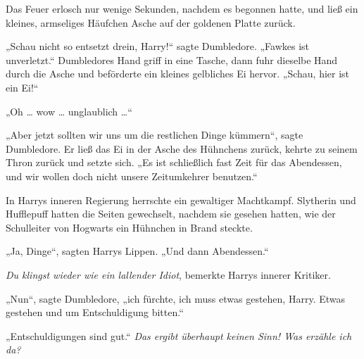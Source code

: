 Das Feuer erlosch nur wenige Sekunden, nachdem es begonnen hatte, und ließ ein kleines, armseliges Häufchen Asche auf der goldenen Platte zurück.

„Schau nicht so entsetzt drein, Harry!“ sagte Dumbledore.
„Fawkes ist unverletzt.“ Dumbledores Hand griff in eine Tasche, dann fuhr dieselbe Hand durch die Asche und beförderte ein kleines gelbliches Ei hervor.
„Schau, hier ist ein Ei!“

„Oh … wow … unglaublich …“

„Aber jetzt sollten wir uns um die restlichen Dinge kümmern“, sagte Dumbledore. Er ließ das Ei in der Asche des Hühnchens zurück, kehrte zu seinem Thron zurück und setzte sich.
„Es ist schließlich fast Zeit für das Abendessen, und wir wollen doch nicht unsere Zeitumkehrer benutzen.“

In Harrys inneren Regierung herrschte ein gewaltiger Machtkampf. Slytherin und Hufflepuff hatten die Seiten gewechselt, nachdem sie gesehen hatten, wie der Schulleiter von Hogwarts ein Hühnchen in Brand steckte.

„Ja, Dinge“, sagten Harrys Lippen.
„Und dann Abendessen.“

\emph{Du klingst wieder wie ein lallender Idiot}, bemerkte Harrys innerer Kritiker.

„Nun“, sagte Dumbledore, „ich fürchte, ich muss etwas gestehen, Harry. Etwas gestehen und um Entschuldigung bitten.“

„Entschuldigungen sind gut.“ \emph{Das ergibt überhaupt keinen Sinn! Was erzähle ich da?}

